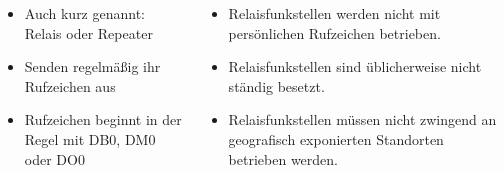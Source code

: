 \begin{frame}
\begin{columns}
    \begin{column}{0.48\textwidth}
    \begin{itemize}
  \item Auch kurz genannt: Relais oder Repeater
  \item Senden regelmäßig ihr Rufzeichen aus
  \item Rufzeichen beginnt in der Regel mit DB0, DM0 oder DO0
  \end{itemize}

    \end{column}
    \pause
    
   \begin{column}{0.48\textwidth}
       \begin{itemize}
  \item Relaisfunkstellen werden nicht mit persönlichen Rufzeichen betrieben.
  \item Relaisfunkstellen sind üblicherweise nicht ständig besetzt.
  \item Relaisfunkstellen müssen nicht zwingend an geografisch exponierten Standorten betrieben werden.
  \end{itemize}

   \end{column}
\end{columns}



\end{frame}

